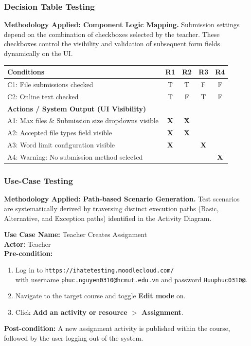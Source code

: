 \documentclass[twoside,final]{hcmut-report}
\begin{document}
\subsubsection{Decision Table Testing}
\textbf{Methodology Applied: Component Logic Mapping.} 
Submission settings depend on the combination of checkboxes selected by the teacher. These checkboxes control the visibility and validation of subsequent form fields dynamically on the UI.

\begin{table}[H]
\centering
\renewcommand{\arraystretch}{1.2}
\begin{tabularx}{\textwidth}{|>{\raggedright\arraybackslash}X|c|c|c|c|}
\hline
\textbf{Conditions} & \textbf{R1} & \textbf{R2} & \textbf{R3} & \textbf{R4} \\ \hline
C1: File submissions checked & T & T & F & F \\ \hline
C2: Online text checked & T & F & T & F \\ \hline
\hline
\textbf{Actions / System Output (UI Visibility)} & & & & \\ \hline
A1: Max files \& Submission size dropdowns visible & \textbf{X} & \textbf{X} & & \\ \hline
A2: Accepted file types field visible & \textbf{X} & \textbf{X} & & \\ \hline
A3: Word limit configuration visible & \textbf{X} & & \textbf{X} & \\ \hline
A4: Warning: No submission method selected & & & & \textbf{X} \\ \hline
\end{tabularx}
\end{table}

\subsubsection{Use-Case Testing}
\textbf{Methodology Applied: Path-based Scenario Generation.} 
Test scenarios are systematically derived by traversing distinct execution paths (Basic, Alternative, and Exception paths) identified in the Activity Diagram.

\vspace{0.2cm}
\noindent\textbf{Use Case Name:} Teacher Creates Assignment \\
\textbf{Actor:} Teacher \\
\textbf{Pre-condition:} 
\begin{enumerate}
    \item Log in to \texttt{https://ihatetesting.moodlecloud.com/}\\ with username \texttt{phuc.nguyen0310@hcmut.edu.vn} and password \texttt{Huuphuc0310@}.
    \item Navigate to the target course and toggle \textbf{Edit mode} on.
    \item Click \textbf{Add an activity or resource $>$ Assignment}.
\end{enumerate}
\textbf{Post-condition:} A new assignment activity is published within the course, followed by the user logging out of the system.
\end{document}
